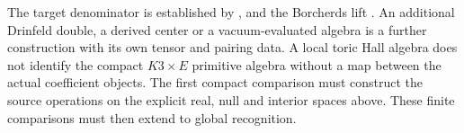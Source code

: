 The target denominator is established by
\cite[Sections~3--4]{GN}, \cite[Theorem~2.1 and Section~5.1.1]{GNII}
and the Borcherds lift \cite{Borcherds95,B}. An additional Drinfeld
double, a derived center or a vacuum-evaluated algebra is a further
construction with its own tensor and pairing data. A local toric
Hall algebra does not identify the compact $K3\times E$ primitive
algebra without a map between the actual coefficient objects.
The first compact comparison must construct the source operations
on the explicit real, null and interior spaces above. These finite
comparisons must then extend to global recognition.
